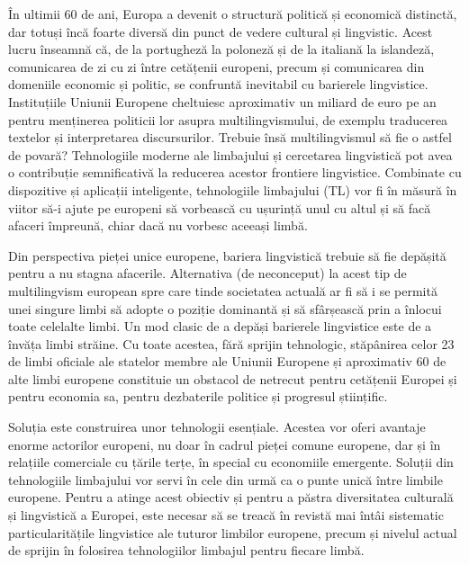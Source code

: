\documentclass[]{../../metanetpaper}
\begin{document}
\begin{multicols}{2}
În ultimii 60 de ani, Europa a devenit o structură politică și economică distinctă, dar totuși încă foarte diversă din punct de vedere cultural și lingvistic. Acest lucru înseamnă că, de la portugheză la poloneză și de la italiană la islandeză, comunicarea de zi cu zi între cetățenii europeni, precum și comunicarea din domeniile economic și politic, se confruntă inevitabil cu barierele lingvistice. Instituțiile Uniunii Europene cheltuiesc aproximativ un miliard de euro pe an pentru menținerea politicii lor asupra multilingvismului, de exemplu traducerea textelor și interpretarea discursurilor. Trebuie însă multilingvismul să fie o astfel de povară? Tehnologiile moderne ale limbajului și cercetarea lingvistică pot avea o contribuție semnificativă la reducerea acestor frontiere lingvistice. Combinate cu dispozitive și aplicații inteligente, tehnologiile limbajului (TL) vor fi în măsură în viitor să-i ajute pe europeni să vorbească cu ușurință unul cu altul și să facă afaceri împreună, chiar dacă nu vorbesc aceeași limbă.


Din perspectiva pieței unice europene, bariera lingvistică trebuie să fie depășită pentru a nu stagna afacerile. Alternativa (de neconceput) la acest tip de multilingvism european spre care tinde societatea actuală ar fi să i se permită unei singure limbi să adopte o poziție dominantă și să sfârșească prin a înlocui toate celelalte limbi. Un mod clasic de a depăși barierele lingvistice este de a învăța limbi străine. Cu toate acestea, fără sprijin tehnologic, stăpânirea celor 23 de limbi oficiale ale statelor membre ale Uniunii Europene și aproximativ 60 de alte limbi europene constituie un obstacol de netrecut pentru cetățenii Europei și pentru economia sa, pentru dezbaterile politice și progresul științific.

Soluția este construirea unor tehnologii esențiale. Acestea vor oferi avantaje enorme actorilor europeni, nu doar în cadrul pieței comune europene, dar și în relațiile comerciale cu țările terțe, în special cu economiile emergente. Soluții din tehnologiile limbajului vor servi în cele din urmă ca o punte unică între limbile europene. Pentru a atinge acest obiectiv și pentru a păstra diversitatea culturală și lingvistică a Europei, este necesar să se treacă în revistă mai întâi sistematic particularitățile lingvistice ale tuturor limbilor europene, precum și nivelul actual de sprijin în folosirea tehnologiilor limbajul pentru fiecare limbă. 


\end{multicols}
\end{document}
